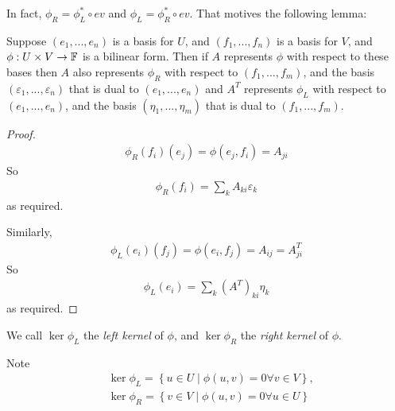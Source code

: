 \documentclass[a4paper]{article}
\begin{document}
In fact, $\phi_R = \phi_L^* \circ ev$ and $\phi_L = \phi_R^* \circ ev$. That motives the following lemma:

\begin{lemma}
Suppose $\left(e_1,...,e_n\right)$ is a basis for $U$, and $\left(f_1,...,f_n\right)$ is a basis for $V$, and $\phi: U \times V \to \mathbb{F}$ is a bilinear form. Then if $A$ represents $\phi$ with respect to these bases then $A$ also represents $\phi_R$ with respect to $\left(f_1,...,f_m\right)$, and the basis $\left(\varepsilon_1,...,\varepsilon_n\right)$ that is dual to $\left(e_1,...,e_n\right)$ and $A^T$ represents $\phi_L$ with respect to $\left(e_1,...,e_n\right)$, and the basis $\left(\eta_1,...,\eta_m\right)$ that is dual to $\left(f_1,...,f_m\right)$.
\begin{proof}
\begin{equation*}
\begin{aligned}
\phi_R\left(f_i\right) \left(e_j\right) = \phi\left(e_j,f_i\right) = A_{ji}
\end{aligned}
\end{equation*}
So
\begin{equation*}
\begin{aligned}
\phi_R\left(f_i\right) = \sum_k A_{ki} \varepsilon_k
\end{aligned}
\end{equation*}
as required.

Similarly,
\begin{equation*}
\begin{aligned}
\phi_L \left(e_i\right)\left(f_j\right) = \phi\left(e_i,f_j\right) = A_{ij} = A_{ji}^T
\end{aligned}
\end{equation*}
So
\begin{equation*}
\begin{aligned}
\phi_L\left(e_i\right) = \sum_k\left(A^T\right)_{ki} \eta_k
\end{aligned}
\end{equation*}
as required.
\end{proof}
\end{lemma}

We call $\ker \phi_L$ the \emph{left kernel} of $\phi$, and $\ker \phi_R$ the \emph{right kernel} of $\phi$.

Note 
\begin{equation*}
\begin{aligned}
&\ker \phi_L = \left\{u \in U \mid \phi\left(u,v\right) = 0 \forall v\in V\right\},\\
&\ker \phi_R = \left\{v \in V \mid \phi\left(u,v\right) = 0 \forall u\in U\right\}
\end{aligned}
\end{equation*}
\end{document}
